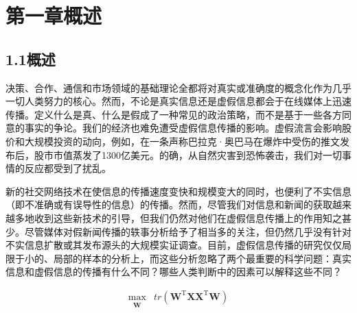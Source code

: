 \documentclass[a4paper,AutoFakeBold,oneside,12pt]{book}
\begin{document}
\begin{nopagenumber}
\begin{center}
		\xiaosihao{}

		\xiaosihao{}
	\end{center}

	\songti{}
	\begingroup %
	\let\clearpage\relax
	\let\cleardoublepage\relax


	\chapter*{第一章\quad{}概述}
	\newtranschapter

	\section*{1.1\quad{}概述}
	决策、合作、通信和市场领域的基础理论全都将对真实或准确度的概念化作为几乎一切人类努力的核心。然而，不论是真实信息还是虚假信息都会于在线媒体上迅速传播。定义什么是真、什么是假成了一种常见的政治策略，而不是基于一些各方同意的事实的争论。我们的经济也难免遭受虚假信息传播的影响。虚假流言会影响股价和大规模投资的动向，例如，在一条声称巴拉克·奥巴马在爆炸中受伤的推文发布后，股市市值蒸发了1300亿美元。的确，从自然灾害到恐怖袭击，我们对一切事情的反应都受到了扰乱。

	新的社交网络技术在使信息的传播速度变快和规模变大的同时，也便利了不实信息（即不准确或有误导性的信息）的传播。然而，尽管我们对信息和新闻的获取越来越多地收到这些新技术的引导，但我们仍然对他们在虚假信息传播上的作用知之甚少。尽管媒体对假新闻传播的轶事分析给予了相当多的关注，但仍然几乎没有针对不实信息扩散或其发布源头的大规模实证调查。目前，虚假信息传播的研究仅仅局限于小的、局部的样本的分析上，而这些分析忽略了两个最重要的科学问题：真实信息和虚假信息的传播有什么不同？哪些人类判断中的因素可以解释这些不同？

	\begin{equation}
		\label{PCA_goal_appx1}
		\begin{aligned}
			\max_{\substack{\bm{W}}} & tr(\bm{W}^\mathrm{T}\bm{X}\bm{X}^ \mathrm{T}\bm{W})
		\end{aligned}
	\end{equation}


\end{nopagenumber}
\end{document}
